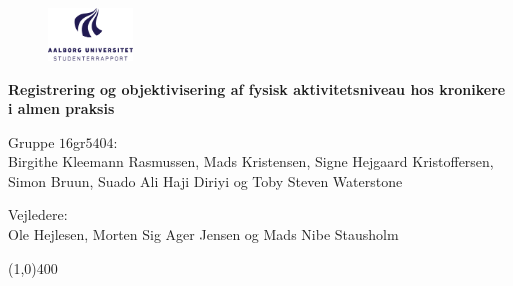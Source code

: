 \clearpage
\thispagestyle{empty}

\begin{figure}[H]
	\raggedleft
		\includegraphics[width=0.2\textwidth]{figures/aaulogo-da.png}
\end{figure} 
\vspace*{\fill} 
\begin{center}	
\begin{Huge}
\textbf{Registrering og objektivisering af fysisk aktivitetsniveau hos kronikere i almen praksis}\\
\vspace{3 mm}
\end{Huge}
\end{center}
{\large Gruppe $16$gr$5404$:}\\
{\normalsize Birgithe Kleemann Rasmussen, Mads Kristensen, Signe Hejgaard Kristoffersen,}\\ {\normalsize Simon Bruun, Suado Ali Haji Diriyi og Toby Steven Waterstone}

\vspace{3 mm}
\noindent
{\large Vejledere:}\\
{\normalsize Ole Hejlesen, Morten Sig Ager Jensen og Mads Nibe Stausholm}

\vspace*{\fill}

\begin{center}
\line(1,0){400}
\end{center}